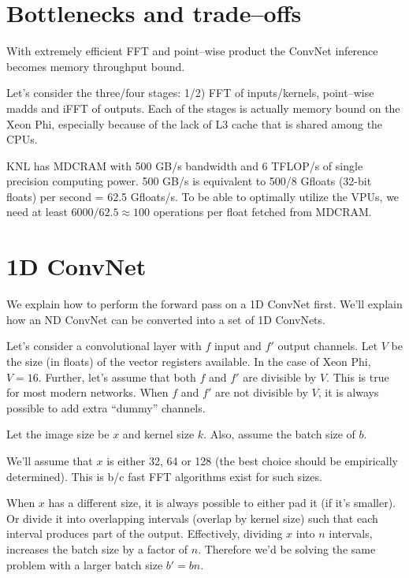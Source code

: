 \section{Bottlenecks and trade--offs}

  With extremely efficient FFT and point--wise product the ConvNet
  inference becomes memory throughput bound.

  Let's consider the three/four stages: 1/2) FFT of inputs/kernels,
  point--wise madds and iFFT of outputs.  Each of the stages is
  actually memory bound on the Xeon Phi, especially because of the
  lack of L3 cache that is shared among the CPUs.

  KNL has MDCRAM with 500 GB/s bandwidth and 6 TFLOP/s of single
  precision computing power.  500 GB/s is equivalent to 500/8 Gfloats
  (32-bit floats) per second = 62.5 Gfloats/s.  To be able to
  optimally utilize the VPUs, we need at least $6000/62.5 \approx 100$
  operations per float fetched from MDCRAM.

\section{1D ConvNet}

  We explain how to perform the forward pass on a 1D ConvNet first.
  We'll explain how an ND ConvNet can be converted into a set of 1D
  ConvNets.

  Let's consider a convolutional layer with $f$ input and $f'$ output
  channels.  Let $V$ be the size (in floats) of the vector registers
  available.  In the case of Xeon Phi, $V=16$.  Further, let's assume
  that both $f$ and $f'$ are divisible by $V$.  This is true for most
  modern networks.  When $f$ and $f'$ are not divisible by $V$, it is
  always possible to add extra ``dummy'' channels.

  Let the image size be $x$ and kernel size $k$.  Also, assume the
  batch size of $b$.

  We'll assume that $x$ is either 32, 64 or 128 (the best choice
  should be empirically determined).  This is b/c fast FFT algorithms
  exist for such sizes.

  When $x$ has a different size, it is always possible to either pad
  it (if it's smaller).  Or divide it into overlapping intervals
  (overlap by kernel size) such that each interval produces part of
  the output.  Effectively, dividing $x$ into $n$ intervals, increases
  the batch size by a factor of $n$.  Therefore we'd be solving the
  same problem with a larger batch size $b' = bn$.

